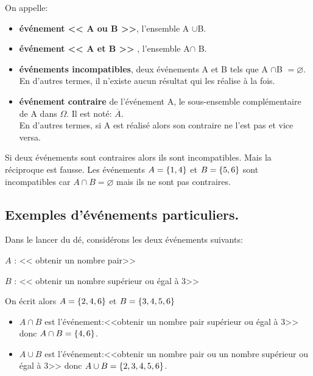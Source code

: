 \begin{definition}
On appelle:
\begin{itemize}

\item \textbf{ événement  << A ou B >>}, l’ensemble A  $ \cup $B.
\item \textbf{ événement  << A et B >>} , l’ensemble A$ \cap $ B.
\item \textbf{ événements incompatibles}, deux événements A et B tels que A $ \cap $B $ = \varnothing$.\\ En d'autres termes, il n'existe aucun résultat qui les réalise à la fois.
\item \textbf{événement contraire } de l’événement A, le sous-ensemble complémentaire de A dans $ \Omega $. 
Il est noté:  $ \overline{A} $.\\ En d'autres termes, si A est réalisé alors son contraire ne l'est pas et vice versa.
\end{itemize}
\end{definition}

\begin{remark}
 Si deux événements sont contraires alors ils sont incompatibles. Mais la réciproque est fausse. Les événements $ A=\left\{1,4\right\} $  et $ B=\left\{5,6\right\} $ sont incompatibles car $ A\cap B= \varnothing$  mais  ils ne sont pas contraires.
 \end{remark}

\subsection*{Exemples d'événements particuliers.}
Dans le lancer du dé, considérons les deux événements suivants:
\begin{description}
\item $ A$ :  <<  obtenir un nombre pair>>
\item $ B $  :   <<  obtenir un nombre supérieur ou égal à 3>>
\end{description}
On écrit alors $ A=\left\{2,4,6\right\} $ et $ B=\left\{3,4,5,6\right\} $
\begin{itemize}
\item $ A\cap B $ est l'événement:<<obtenir un nombre pair supérieur ou égal à 3>>  donc $ A\cap B=\left\{4,6\right\} $.
\item  $ A\cup B $ est l'événement:<<obtenir un nombre pair ou  un nombre  supérieur ou égal à 3>>  donc $ A\cup B=\left\{2,3,4,5,6\right\} $.
\end{itemize}




